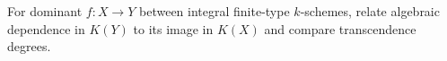 \begin{problem}\label{chal:vi27-03}
For dominant $f:X\to Y$ between integral finite-type $k$-schemes, relate algebraic dependence in $K(Y)$ to its image in $K(X)$ and compare transcendence degrees.
\end{problem}
